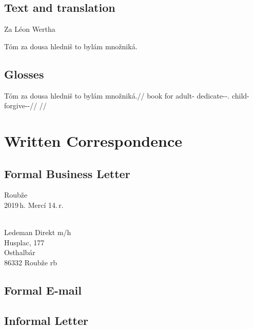\subsection{Text and translation}

Za Léon Wertha

Tóm za dousa hledniš to bylám množniká.


\subsection{Glosses}

\pex
	\begingl
	\gla Tóm za dousa hledniš to bylám množniká.//
	\glb book for adult-\Acc{} dedicate-\Pv{}-\Sbj{}.\Pf{} \Rz{} child-\Agt{} forgive-\Pv{}-\Hort{}//
	\glft {}//
	\endgl
\xe

\section{Written Correspondence}\label{sec:writcorr}

\subsection{Formal Business Letter}
{\small
\begin{flushright}
	Roubže\\
	2019\,h. Mercí 14.\,r.
\end{flushright}

\\
Ledeman Direkt {\sc m/h}\\
Husplac, \textnumero{} 177\\
Osthalbár\\
86332 Roubže {\sc rb}
}

\subsection{Formal E-mail}




\subsection{Informal Letter}
